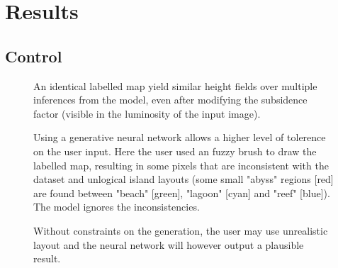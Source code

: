 
\section{Results}
\label{sec:coral-island-results}

\subsection{Control}

\begin{figure}[H]
    \caption{An identical labelled map yield similar height fields over multiple inferences from the model, even after modifying the subsidence factor (visible in the luminosity of the input image).}
    \label{fig:coral-island-results1}
\end{figure}
\begin{figure}[H]
    \caption{Using a generative neural network allows a higher level of tolerence on the user input. Here the user used an fuzzy brush to draw the labelled map, resulting in some pixels that are inconsistent with the dataset and unlogical island layouts (some small "abyss" regions [red] are found between "beach" [green], "lagoon" [cyan] and "reef" [blue]). The model ignores the inconsistencies. }
    \label{fig:coral-island-results2}
\end{figure}
\begin{figure}[H]
    \caption{Without constraints on the generation, the user may use unrealistic layout and the neural network will however output a plausible result.}
    \label{fig:coral-island-results_dino}
\end{figure}


